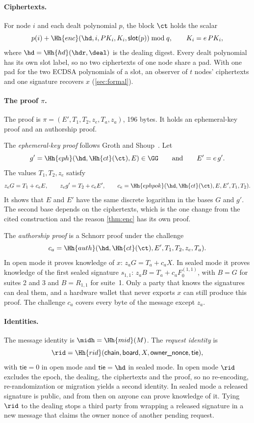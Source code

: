 \paragraph{Ciphertexts.} For node $i$ and each dealt polynomial $p$, the block $\ct$ holds the scalar
\[
  p(i) + \Hh{enc}(\hd, i, PK_i, K_i, \mathsf{slot}(p)) \bmod q, \qquad K_i = e\,PK_i ,
\]
where $\hd = \Hh{hd}(\hdr, \deal)$ is the dealing digest. Every dealt polynomial has its own slot label, so no two ciphertexts of one node share a pad. With one pad for the two ECDSA polynomials of a slot, an observer of $t$ nodes' ciphertexts and one signature recovers $x$ (\cref{sec:formal}).

\paragraph{The proof $\pi$.} The proof is $\pi = (E', T_1, T_2, z_e, T_a, z_a)$, 196 bytes. It holds an ephemeral-key proof and an authorship proof.

The \emph{ephemeral-key proof} follows Groth and Shoup~\cite[Section~4.1]{GS22}. Let
\[
  g' = \Hh{eph}(\hd, \Hh{ct}(\ct), E) \in \GG \qquad\text{and}\qquad E' = e\,g' .
\]
The values $T_1, T_2, z_e$ satisfy
\[
  z_e G = T_1 + c_e E, \qquad z_e g' = T_2 + c_e E', \qquad c_e = \Hh{ephpok}(\hd, \Hh{ct}(\ct), E, E', T_1, T_2).
\]
It shows that $E$ and $E'$ have the same discrete logarithm in the bases $G$ and $g'$. The second base depends on the ciphertexts, which is the one change from the cited construction and the reason \cref{thm:enc} has its own proof.

The \emph{authorship proof} is a Schnorr proof under the challenge
\[
  c_a = \Hh{auth}(\hd, \Hh{ct}(\ct), E', T_1, T_2, z_e, T_a).
\]
In open mode it proves knowledge of $x$: $z_a G = T_a + c_a X$. In sealed mode it proves knowledge of the first sealed signature $s_{1,1}$: $z_a B = T_a + c_a F_0^{(1,1)}$, with $B = G$ for suites 2 and 3 and $B = R_{1,1}$ for suite~1. Only a party that knows the signatures can deal them, and a hardware wallet that never exports $x$ can still produce this proof. The challenge $c_a$ covers every byte of the message except $z_a$.

\paragraph{Identities.} The message identity is $\midh = \Hh{mid}(M)$. The \emph{request identity} is
\[
  \rid = \Hh{rid}(\textsf{chain}, \textsf{board}, X, \textsf{owner\_nonce}, \mathsf{tie}),
\]
with $\mathsf{tie} = 0$ in open mode and $\mathsf{tie} = \hd$ in sealed mode. In open mode $\rid$ excludes the epoch, the dealing, the ciphertexts and the proof, so no re-encoding, re-randomization or migration yields a second identity. In sealed mode a released signature is public, and from then on anyone can prove knowledge of it. Tying $\rid$ to the dealing stops a third party from wrapping a released signature in a new message that claims the owner nonce of another pending request.

